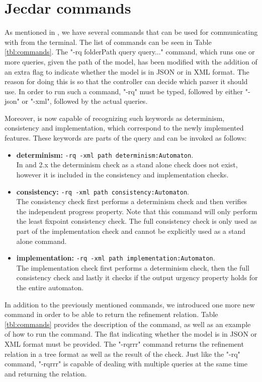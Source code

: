 \section{Jecdar commands}
As mentioned in \textcite{Jecdar:2019}, we have several commands that can be used for communicating with \jecdar from the terminal. The list of commands can be seen in Table \ref{tbl:commands}. The "-rq folderPath query query..." command, which runs one or more queries, given the path of the model, has been modified with the addition of an extra flag to indicate whether the model is in JSON or in XML format. The reason for doing this is so that the controller can decide which parser it should use. In order to run such a command, "-rq" must be typed, followed by either "-json" or "-xml", followed by the actual queries.

Moreover, \jecdar is now capable of recognizing such keywords as determinism, consistency and implementation, which correspond to the newly implemented features. These keywords are parts of the query and can be invoked as follows: 

\begin{itemize}
    \item \textbf{determinism:} \texttt{-rq -xml path determinism:Automaton}. \\
    In  and \ecdar 2.x the determinism check as a stand alone check does not exist, however it is included in the consistency and implementation checks. 
    \item \textbf{consistency:} \texttt{-rq -xml path consistency:Automaton}. \\
    The consistency check first performs a determinism check and then verifies the independent progress property. Note that this command will only perform the least fixpoint consistency check. The full consistency check is only used as part of the implementation check and cannot be explicitly used as a stand alone command.
    \item \textbf{implementation:} \texttt{-rq -xml path implementation:Automaton}. \\
    The implementation check first performs a determinism check, then the full consistency check and lastly it checks if the output urgency property holds for the entire automaton.
\end{itemize}

In addition to the previously mentioned commands, we introduced one more new command in order to be able to return the refinement relation. Table \ref{tbl:commands} provides the description of the command, as well as an example of how to run the command. The flat indicating whether the model is in JSON or XML format must be provided. The "-rqrrr" command returns the refinement relation in a tree format as well as the result of the check. Just like the "-rq" command, "-rqrrr" is capable of dealing with multiple queries at the same time and returning the relation.

